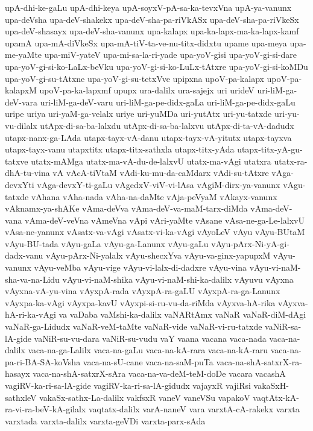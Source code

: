 {upA-dhi-ke-gaLu
upA-dhi-keya
upA-soyxV-pA-sa-ka-tevxVna
upA-ya-vanunx
upa-deVsha
upa-deV-shakekx
upa-deV-sha-pa-riVkASx
upa-deV-sha-pa-riVkeSx
upa-deV-shasayx
upa-deV-sha-vanunx
upa-kalapx
upa-ka-lapx-ma-ka-lapx-kamf
upamA
upa-mA-diVkeSx
upa-mA-tiV-ta-ve-nu-titx-didxtu
upame
upa-meya
upa-me-yaMte
upa-miV-yateV
upa-mi-sa-la-ri-yade
upa-yoV-gisi
upa-yoV-gi-si-dare
upa-yoV-gi-si-ko-LaLx-beVku
upa-yoV-gi-si-ko-LuLx-tAtxre
upa-yoV-gi-si-koMDu
upa-yoV-gi-su-tAtxne
upa-yoV-gi-su-tetxVve
upipxna
upoV-pa-kalapx
upoV-pa-kalapxM
upoV-pa-ka-lapxmf
upupx
ura-dalilx
ura-sajejx
uri
urideV
uri-liM-ga-deV-vara
uri-liM-ga-deV-varu
uri-liM-ga-pe-didx-gaLa
uri-liM-ga-pe-didx-gaLu
uripe
uriya
uri-yaM-ga-velalx
uriye
uri-yuMDa
uri-yutAtx
uri-yu-tatxde
uri-yu-vu-dilalx
utApx-di-sa-ba-lalxdu
utApx-di-sa-ba-lalxvu
utApx-di-ta-vA-dadudx
utapx-nanx-ga-LAda
utapx-tayx-vA-danu
utapx-tayx-vA-yitutx
utapx-tayxva
utapx-tayx-vanu
utapxtitx
utapx-titx-sathxla
utapx-titx-yAda
utapx-titx-yA-gu-tatxve
utatx-mAMga
utatx-ma-vA-du-de-lalxvU
utatx-ma-vAgi
utatxra
utatx-ra-dhA-tu-vina
vA
vAcA-tiVtaM
vAdi-ku-mu-da-caMdarx
vAdi-su-tAtxre
vAga-devxYti
vAga-devxY-ti-gaLu
vAgedxV-viV-vi-lAsa
vAgiM-dirx-ya-vanunx
vAgu-tatxde
vAhana
vAha-nada
vAha-na-daMte
vAja-peVyaM
vAkayx-vanunx
vAknamx-ya-shAKe
vAma-deVva
vAma-deV-va-maM-tarx-diMda
vAma-deV-vana
vAma-deV-veVna
vAmeVna
vApi
vAri-yaMte
vAsane
vAsa-ne-ga-Le-lalxvU
vAsa-ne-yanunx
vAsatx-va-vAgi
vAsatx-vi-ka-vAgi
vAyoLeV
vAyu
vAyu-BUtaM
vAyu-BU-tada
vAyu-gaLa
vAyu-ga-Lanunx
vAyu-gaLu
vAyu-pArx-Ni-yA-gi-dadx-vanu
vAyu-pArx-Ni-yalalx
vAyu-shecxYva
vAyu-va-ginx-yapupxM
vAyu-vanunx
vAyu-veMba
vAyu-vige
vAyu-vi-lalx-di-dadxre
vAyu-vina
vAyu-vi-naM-sha-va-na-Lidu
vAyu-vi-naM-shika
vAyu-vi-naM-shi-ka-dalilx
vAyuvu
vAyxna
vAyxna-vA-yu-vina
vAyxpA-rada
vAyxpA-ra-gaLU
vAyxpA-ra-ga-Lanunx
vAyxpa-ka-vAgi
vAyxpa-kavU
vAyxpi-si-ru-vu-da-riMda
vAyxva-hA-rika
vAyxva-hA-ri-ka-vAgi
va
vaDaba
vaMshi-ka-dalilx
vaNARtAmx
vaNaR
vaNaR-diM-dAgi
vaNaR-ga-Lidudx
vaNaR-veM-taMte
vaNaR-vide
vaNaR-vi-ru-tatxde
vaNiR-sa-lA-gide
vaNiR-su-vu-dara
vaNiR-su-vudu
vaY
vaana
vacana
vaca-nada
vaca-na-dalilx
vaca-na-ga-Lalilx
vaca-na-gaLu
vaca-na-kA-rara
vaca-na-kA-raru
vaca-na-pa-ri-BA-SA-koVsha
vaca-na-sU-cane
vaca-na-saM-puTa
vaca-na-shA-satxrX-ra-hasayx
vaca-na-shA-satxrX-sAra
vaca-na-va-deM-teM-doDe
vacara
vacashA
vagiRV-ka-ri-sa-lA-gide
vagiRV-ka-ri-sa-lA-gidudx
vajayxR
vajiRsi
vakaSxH-sathxleV
vakaSx-sathx-La-dalilx
vakfsxR
vaneV
vaneVSu
vapakoV
vaqtAtx-kA-ra-vi-ra-beV-kA-gilalx
vaqtatx-dalilx
varA-naneV
vara
varxtA-cA-rakekx
varxta
varxtada
varxta-dalilx
varxta-geVDi
varxta-parx-sAda
}
